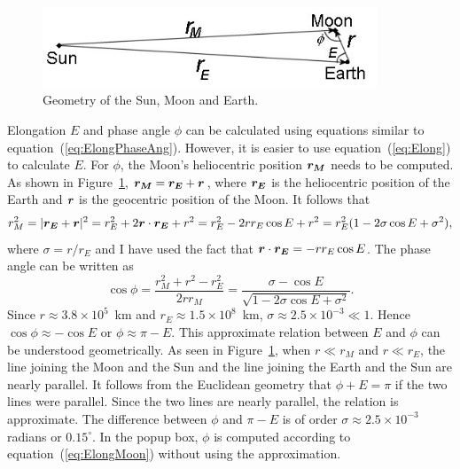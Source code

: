 \documentclass[12pt]{article}
\newcommand \beq {\begin{equation}}
\newcommand \eeq {\end{equation}}
\newcommand{\ve}[1]{\mbox{\boldmath $#1$}}
\begin{document}
\begin{figure}[h]
\begin{center}
\includegraphics[width=10cm]{sunEarthMoon.jpg}
\end{center}
\caption{Geometry of the Sun, Moon and Earth.}
\label{fig:SunMoonEarth}
\end{figure}

Elongation $E$ and phase angle $\phi$ can be calculated using equations similar to 
equation~(\ref{eq:ElongPhaseAng}). However, it is easier to use 
equation~(\ref{eq:Elong}) to calculate $E$. For $\phi$, 
the Moon's heliocentric position $\ve{r_M}$ needs to be computed. As shown in 
Figure~\ref{fig:SunMoonEarth}, $\ve{r_M}=\ve{r_E}+\ve{r}$, where 
$\ve{r_E}$ is the heliocentric 
position of the Earth and $\ve{r}$ is the geocentric position of the Moon. 
It follows that 
\beq
  r_M^2 = |\ve{r_E}+\ve{r}|^2 = r_E^2 + 2\ve{r}\cdot \ve{r_E} + r^2 = 
r_E^2 - 2 r r_E \cos E+r^2 = r_E^2(1-2\sigma \cos E + \sigma^2) ,
\eeq
where $\sigma=r/r_E$ and I have used the fact that 
$\ve{r}\cdot \ve{r_E}=-r r_E \cos E$. The phase angle can be written as 
\beq
  \cos \phi = \frac{r_M^2+r^2-r_E^2}{2rr_M} = \frac{\sigma - \cos E}
{\sqrt{1-2\sigma\cos E + \sigma^2}} .
\label{eq:ElongMoon}
\eeq
Since $r \approx 3.8\times 10^{5}$~km and $r_E\approx 1.5\times 10^8$~km, 
$\sigma \approx 2.5\times 10^{-3} \ll 1$. Hence $\cos \phi \approx -\cos E$ or 
$\phi \approx \pi - E$. This approximate relation between $E$ and $\phi$ can 
be understood geometrically. As seen in Figure~\ref{fig:SunMoonEarth}, when 
$r \ll r_M$ and $r \ll r_E$, the line joining the Moon and the Sun and the 
line joining the Earth and the Sun are nearly parallel. It follows from the 
Euclidean geometry that $\phi + E = \pi$ if the two lines were parallel. Since 
the two lines are nearly parallel, the relation is approximate.
The difference between $\phi$ and $\pi - E$ is of 
order $\sigma \approx 2.5\times 10^{-3}$ radians or $0.15^\circ$. 
In the popup box, $\phi$ is computed according to equation~(\ref{eq:ElongMoon}) 
without using the approximation. 
\end{document}
